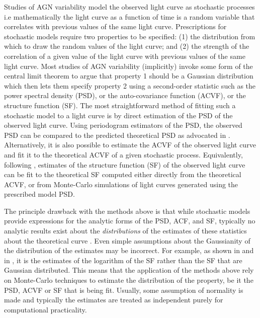 \documentclass[a4paper,fleqn,usenatbib]{mnras}
\begin{document}
Studies of AGN variability model the observed light curve as stochastic processes i.e mathematically the light curve as a function of time is a random variable that correlates with previous values of the same light curve. Prescriptions for stochastic models require two properties to be specified: (1) the distribution from which to draw the random values of the light curve; and (2) the strength of the correlation of a given value of the light curve with previous values of the same light curve. Most studies of AGN variability (implicitly) invoke some form of the central limit theorem to argue that property 1 should be a Gaussian distribution which then lets them specify property 2 using a second-order statistic such as the power spectral density (PSD), or the auto-covariance function (ACVF), or the structure function (SF). The most straightforward method of fitting such a stochastic model to a light curve is by direct estimation of the PSD of the observed light curve. Using periodogram estimators of the PSD, the observed PSD can be compared to the predicted theoretical PSD as advocated in \citet*{Uttley02}. Alternatively, it is also possible to estimate the ACVF of the observed light curve and fit it to the theoretical ACVF of a given stochastic process. Equivalently, following \citet*{Kasliwal15}, estimates of the structure function (SF) of the observed light curve can be fit to the theoretical SF computed either directly from the theoretical ACVF, or from Monte-Carlo simulations of light curves generated using the prescribed model PSD.

The principle drawback with the methods above is that while stochastic models provide expressions for the analytic forms of the PSD, ACF, and SF, typically no analytic results exist about the \textit{distributions} of the estimates of these statistics about the theoretical curve \citep{BrockwellDavisITSF}. Even simple assumptions about the Gaussianity of the distribution of the estimates may be incorrect. For example, as shown in \citet*{Emm10} and in \citet{Kasliwal15}, it is the estimates of the logarithm of the SF rather than the SF that are Gaussian distributed. This means that the application of the methods above rely on Monte-Carlo techniques to estimate the distribution of the property, be it the PSD, ACVF or SF that is being fit. Usually, some assumption of normality is made and typically the estimates are treated as independent purely for computational practicality. 
\end{document}
